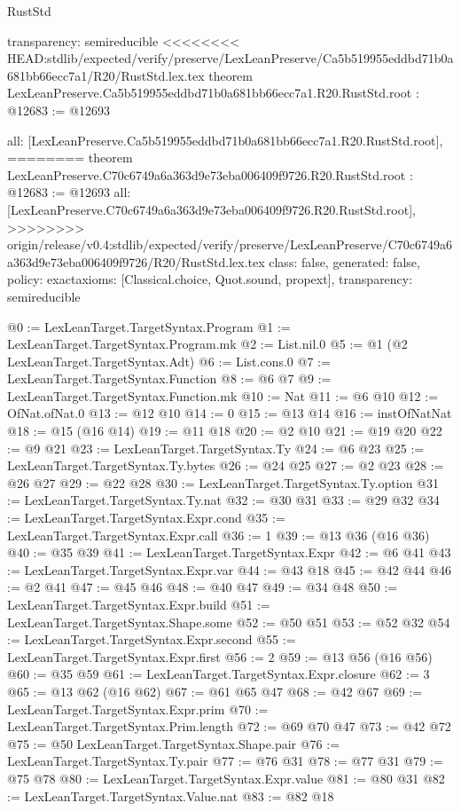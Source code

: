 \begin{lexlean}{RustStd}
\begin{coremodule}
{\begin{coremodule}
{{{{{{{{{{{{{{  transparency: semireducible
}
<<<<<<<< HEAD:stdlib/expected/verify/preserve/LexLeanPreserve/Ca5b519955eddbd71b0a681bb66ecc7a1/R20/RustStd.lex.tex
theorem LexLeanPreserve.Ca5b519955eddbd71b0a681bb66ecc7a1.R20.RustStd.root : @12683 := @12693 {
  all: [LexLeanPreserve.Ca5b519955eddbd71b0a681bb66ecc7a1.R20.RustStd.root],
========
theorem LexLeanPreserve.C70c6749a6a363d9e73eba006409f9726.R20.RustStd.root : @12683 := @12693 {
  all: [LexLeanPreserve.C70c6749a6a363d9e73eba006409f9726.R20.RustStd.root],
>>>>>>>> origin/release/v0.4:stdlib/expected/verify/preserve/LexLeanPreserve/C70c6749a6a363d9e73eba006409f9726/R20/RustStd.lex.tex
  class: false,
  generated: false,
  policy: exact{axioms: [Classical.choice, Quot.sound, propext]},
  transparency: semireducible
}

@0 := LexLeanTarget.TargetSyntax.Program
@1 := LexLeanTarget.TargetSyntax.Program.mk
@2 := List.nil.{0}
@5 := @1 (@2 LexLeanTarget.TargetSyntax.Adt)
@6 := List.cons.{0}
@7 := LexLeanTarget.TargetSyntax.Function
@8 := @6 @7
@9 := LexLeanTarget.TargetSyntax.Function.mk
@10 := Nat
@11 := @6 @10
@12 := OfNat.ofNat.{0}
@13 := @12 @10
@14 := 0
@15 := @13 @14
@16 := instOfNatNat
@18 := @15 (@16 @14)
@19 := @11 @18
@20 := @2 @10
@21 := @19 @20
@22 := @9 @21
@23 := LexLeanTarget.TargetSyntax.Ty
@24 := @6 @23
@25 := LexLeanTarget.TargetSyntax.Ty.bytes
@26 := @24 @25
@27 := @2 @23
@28 := @26 @27
@29 := @22 @28
@30 := LexLeanTarget.TargetSyntax.Ty.option
@31 := LexLeanTarget.TargetSyntax.Ty.nat
@32 := @30 @31
@33 := @29 @32
@34 := LexLeanTarget.TargetSyntax.Expr.cond
@35 := LexLeanTarget.TargetSyntax.Expr.call
@36 := 1
@39 := @13 @36 (@16 @36)
@40 := @35 @39
@41 := LexLeanTarget.TargetSyntax.Expr
@42 := @6 @41
@43 := LexLeanTarget.TargetSyntax.Expr.var
@44 := @43 @18
@45 := @42 @44
@46 := @2 @41
@47 := @45 @46
@48 := @40 @47
@49 := @34 @48
@50 := LexLeanTarget.TargetSyntax.Expr.build
@51 := LexLeanTarget.TargetSyntax.Shape.some
@52 := @50 @51
@53 := @52 @32
@54 := LexLeanTarget.TargetSyntax.Expr.second
@55 := LexLeanTarget.TargetSyntax.Expr.first
@56 := 2
@59 := @13 @56 (@16 @56)
@60 := @35 @59
@61 := LexLeanTarget.TargetSyntax.Expr.closure
@62 := 3
@65 := @13 @62 (@16 @62)
@67 := @61 @65 @47
@68 := @42 @67
@69 := LexLeanTarget.TargetSyntax.Expr.prim
@70 := LexLeanTarget.TargetSyntax.Prim.length
@72 := @69 @70 @47
@73 := @42 @72
@75 := @50 LexLeanTarget.TargetSyntax.Shape.pair
@76 := LexLeanTarget.TargetSyntax.Ty.pair
@77 := @76 @31
@78 := @77 @31
@79 := @75 @78
@80 := LexLeanTarget.TargetSyntax.Expr.value
@81 := @80 @31
@82 := LexLeanTarget.TargetSyntax.Value.nat
@83 := @82 @18
}}}}}}}}}}}}}}
\end{coremodule}}
\end{coremodule}
\end{lexlean}
